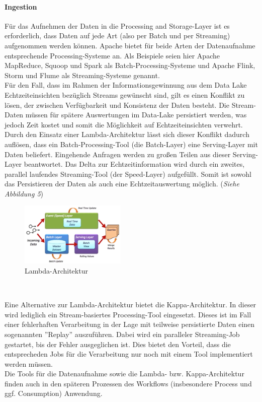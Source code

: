 \documentclass[twoside,twocolumn]{article}
\begin{document}
\paragraph{Ingestion}
		Für das Aufnehmen der Daten in die Processing and Storage-Layer ist es erforderlich, dass Daten auf jede Art (also per Batch und per Streaming) aufgenommen werden können. Apache bietet für beide Arten der Datenaufnahme entsprechende Processing-Systeme an. Als Beispiele seien hier Apache MapReduce, Squoop und Spark als Batch-Processing-Systeme und Apache Flink, Storm und Flume als Streaming-Systeme genannt.\cite{src8}\\
		Für den Fall, dass im Rahmen der Informationsgewinnung aus dem Data Lake Echtzeiteinsichten bezüglich Streams gewünscht sind, gilt es einen Konflikt zu lösen, der zwischen Verfügbarkeit und Konsistenz der Daten besteht. Die Stream-Daten müssen für spätere Auswertungen im Data-Lake persistiert werden, was jedoch Zeit kostet und somit die Möglichkeit auf Echtzeiteinsichten verwehrt. Durch den Einsatz einer Lambda-Architektur lässt sich dieser Konflikt dadurch auflösen, dass ein Batch-Processing-Tool (die Batch-Layer) eine Serving-Layer mit Daten beliefert. Eingehende Anfragen werden zu großen Teilen aus dieser Serving-Layer beantwortet. Das Delta zur Echtzeitinformation wird durch ein zweites, parallel laufendes Streaming-Tool (der Speed-Layer) aufgefüllt. Somit ist sowohl das Persistieren der Daten als auch eine Echtzeitauswertung möglich. (\textit{Siehe Abbildung 5}) \cite{src10} 
		
		\begin{figure}[h]
			\centering 
			\includegraphics[width=0.45\textwidth]{img/lam} 
			\caption{Lambda-Architektur \cite{lam}}	
		\end{figure}\
		
		Eine Alternative zur Lambda-Architektur bietet die Kappa-Architektur. In dieser wird lediglich ein Stream-basiertes Processing-Tool eingesetzt. Dieses ist im Fall einer fehlerhaften Verarbeitung in der Lage mit teilweise persistierte Daten einen sogenannten ''Replay'' auszuführen. Dabei wird ein paralleler Streaming-Job gestartet, bis der Fehler ausgeglichen ist. Dies bietet den Vorteil, dass die entsprecheden Jobs für die Verarbeitung nur noch mit einem Tool implementiert werden müssen.\cite{src11} \\
		Die Tools für die Datenaufnahme sowie die Lambda- bzw. Kappa-Architektur finden auch in den späteren Prozessen des Workflows (insbesondere Process und ggf. Consumption) Anwendung.
		
\end{document}

